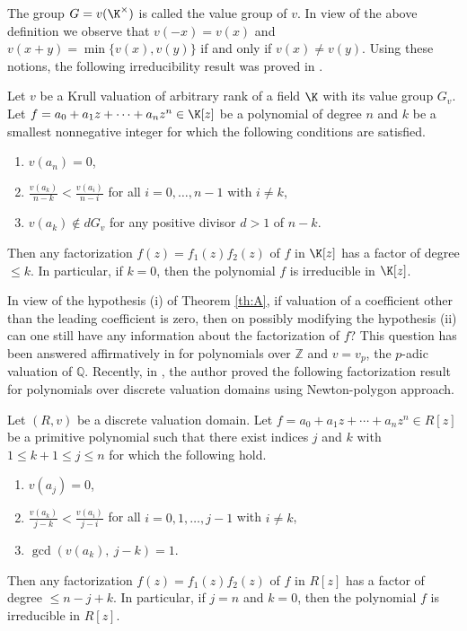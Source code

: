 \documentclass[12pt]{amsart}%
\begin{document}
The group $G=v(\K^\times)$ is called the value group of $v$. In view of the above definition we observe that $v(-x)=v(x)$ and $v(x+y)=\min\{v(x),v(y)\}$ if and only if $v(x)\neq v(y)$.
Using these notions,   the following irreducibility result was proved in \cite{JK}.
\begin{thmx}\label{th:A}
Let $v$ be a Krull valuation of arbitrary rank of a field $\K$ with its value group $G_v$. Let $f=a_0+a_1z+\cdots +a_nz^n \in \K[z]$ be a polynomial of degree $n$ and $k$ be a smallest nonnegative integer for which the following conditions are satisfied.
\begin{enumerate}%
	\item[$(i)$] $v(a_n)=0$,
\item [$(ii)$] $\frac{v(a_k)}{n-k}<\frac{v(a_i)}{n-i}$ for all $i=0,\ldots, n-1$ with $i\neq k$,
	\item[$(iii)$] $v(a_k)\notin dG_v$ for any positive divisor $d>1$ of $n-k$.
\end{enumerate}	
Then any factorization $f(z)=f_1(z)f_2(z)$ of $f$ in $\K[z]$ has a factor of degree $\leq k$. In particular, if $k=0$, then the polynomial $f$ is irreducible in $\K[z]$.
\end{thmx}
In view of the hypothesis (i) of Theorem \ref{th:A}, if  valuation of a coefficient other than the leading coefficient is zero, then on possibly modifying the hypothesis (ii) can one still have any information about the factorization of $f?$ This question has been answered affirmatively in \cite[Theorem 1]{JRG2} for polynomials over $\mathbb{Z}$ and $v=v_p$, the $p$-adic valuation of $\mathbb{Q}$. Recently, in \cite{Singh25}, the author proved the following factorization result for polynomials over discrete valuation domains using Newton-polygon approach.
\begin{thmx}\label{th:B}
Let $(R,v)$  be a discrete valuation domain. Let $f=a_0 + a_1z + \cdots + a_nz^n \in {R}[z]$ be a primitive polynomial such that there exist indices $j$ and $k$ with $1\leq k+1 \leq j\leq n$ for which the following hold.
\begin{enumerate}[label=$(\roman*)$]
\item[$(i)$] $v(a_j)=0$,
\item[$(ii)$]  $\frac{v(a_k)}{j-k}<\frac{v(a_i)}{j-i}$ for all $i=0,1,\ldots, j-1$ with $i\neq k$,
\item[$(iii)$] $\gcd(v(a_k),~j-k) = 1$.
\end{enumerate}
Then any factorization $f(z)=f_1(z)f_2(z)$ of $f$ in $R[z]$ has a factor of degree $\leq n-j+k$. In particular, if $j=n$ and $k=0$, then the polynomial $f$ is irreducible in $R[z]$.
\end{thmx}
\end{document}
